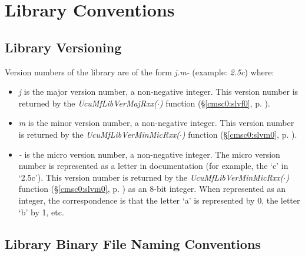 \section{Library Conventions}
\label{ciov0:slcv0}


\subsection{Library Versioning}
\label{ciov0:slcv0:slvn0}

Version numbers of the library are of the
form \emph{j.m-} (example: \emph{2.5c}) where:

\begin{itemize}
\item \emph{j} is the major version number, a non-negative integer.
      This version number is returned by the
      \emph{UcuMfLibVerMajRxx($\cdot$)}
      function (\S{}\ref{cmsc0:slvf0}, p. \pageref{cmsc0:slvf0}).
\item \emph{m} is the minor version number, a non-negative integer.
      This version number is returned by the
      \emph{UcuMfLibVerMinMicRxx($\cdot$)}
      function (\S{}\ref{cmsc0:slvm0}, p. \pageref{cmsc0:slvm0}).
\item \emph{-} is the micro version number, a non-negative integer.  The micro version number
      is represented as a letter in documentation (for example, the `c' in `2.5c').
      This version number is returned by the
      \emph{UcuMfLibVerMinMicRxx($\cdot$)}
      function (\S{}\ref{cmsc0:slvm0}, p. \pageref{cmsc0:slvm0}) as an 8-bit integer.
      When represented as an integer, the correspondence is that the letter `a' is represented by 0,
      the letter `b' by 1, etc.
\end{itemize}


\subsection{Library Binary File Naming Conventions}
\label{ciov0:slcv0:slpn0}


